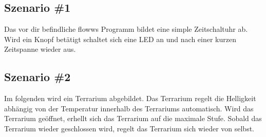 \subsection{Szenario \#1}

Das vor dir befindliche flowws Programm bildet eine simple Zeitschaltuhr ab. Wird ein Knopf betätigt schaltet sich eine LED an und nach einer kurzen Zeitspanne wieder aus.

\subsection{Szenario \#2}

Im folgenden wird ein Terrarium abgebildet. Das Terrarium regelt die Helligkeit abhängig von der Temperatur innerhalb des Terrariums automatisch. Wird das Terrarium geöffnet, erhellt sich das Terrarium auf die maximale Stufe. Sobald das Terrarium wieder geschlossen wird, regelt das Terrarium sich wieder von selbst.

